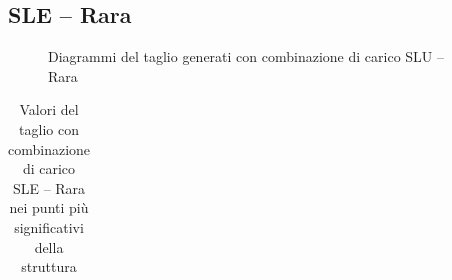\begin{landscape}
\subsection*{SLE -- Rara}
\begin{figure}[H]
\centering
{} 
\caption{Diagrammi del taglio generati con combinazione di carico SLU -- Rara}
\label{fig:Tagli_SLScharacteristic}
\end{figure}
\begin{table}[H]
\centering
\caption{Valori del taglio con combinazione di carico SLE -- Rara nei punti più significativi della struttura}
	\begin{tabular}{lS[table-format=3.2]S[table-format=3.2]S[table-format=3.2]S[table-format=3.2]S[table-format=3.2]S[table-format=3.2]S[table-format=3.2]S[table-format=3.2]S[table-format=3.2]S[table-format=3.2]S[table-format=3.2]S[table-format=3.2]S[table-format=3.2]}

\end{tabular}
\end{table}
\end{landscape}
